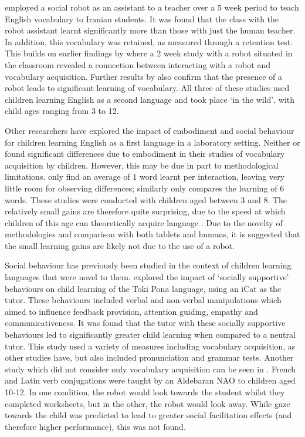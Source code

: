 \cite{alemi2014employing} employed a social robot as an assistant to a teacher over a 5 week period to teach English vocabulary to Iranian students. It was found that the class with the robot assistant learnt significantly more than those with just the human teacher. In addition, this vocabulary was retained, as measured through a retention test. This builds on earlier findings by \cite{kanda2004interactive} where a 2 week study with a robot situated in the classroom revealed a connection between interacting with a robot and vocabulary acquisition. Further results by \cite{tanaka2012children} also confirm that the presence of a robot leads to significant \gls{learning} of vocabulary. All three of these studies used children learning English as a second language and took place `in the wild', with child ages ranging from 3 to 12.

Other researchers have explored the impact of embodiment and social behaviour for children learning English as a first language in a laboratory setting. Neither \cite{gordon2015curiosity} or \cite{westlund2015comparison} found significant differences due to embodiment in their studies of vocabulary acquisition by children. However, this may be due in part to methodological limitations. \cite{gordon2015curiosity} only find an average of 1 word learnt per interaction, leaving very little room for observing differences; similarly \cite{westlund2015comparison} only compares the learning of 6 words. These studies were conducted with children aged between 3 and 8. The relatively small gains are therefore quite surprising, due to the speed at which children of this age can theoretically acquire language \citep{kuhl2010brain}. Due to the novelty of methodologies and comparison with both tablets and humans, it is suggested that the small learning gains are likely not due to the use of a robot.

Social behaviour has previously been studied in the context of children learning languages that were novel to them. \cite{saerbeck2010expressive} explored the impact of `socially supportive' behaviours on child learning of the Toki Pona language, using an iCat as the tutor. These behaviours included verbal and non-verbal manipulations which aimed to influence feedback provision, attention guiding, empathy and communicativeness. It was found that the tutor with these socially supportive behaviours led to significantly greater child learning when compared to a neutral tutor. This study used a variety of measures including vocabulary acquisition, as other studies have, but also included pronunciation and grammar tests. Another study which did not consider only vocabulary acquisition can be seen in \cite{herberg2015robot}. French and Latin verb conjugations were taught by an Aldebaran NAO to children aged 10-12. In one condition, the robot would look towards the student whilst they completed worksheets, but in the other, the robot would look away. While gaze towards the child was predicted to lead to greater social facilitation effects (and therefore higher performance), this was not found.

